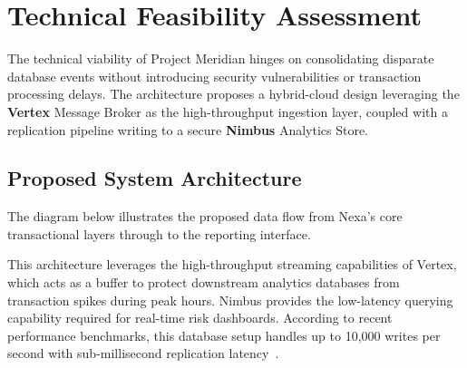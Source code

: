 \section{Technical Feasibility Assessment}
\label{sec:technical}

The technical viability of Project Meridian hinges on consolidating disparate database events without introducing security vulnerabilities or transaction processing delays. The architecture proposes a hybrid-cloud design leveraging the \textbf{Vertex} Message Broker as the high-throughput ingestion layer, coupled with a replication pipeline writing to a secure \textbf{Nimbus} Analytics Store.

\vspace{1em}
\subsection{Proposed System Architecture}
The diagram below illustrates the proposed data flow from Nexa's core transactional layers through to the reporting interface.

\vspace{1em}
\begin{center}
\end{center}
\vspace{1.2em}

This architecture leverages the high-throughput streaming capabilities of Vertex, which acts as a buffer to protect downstream analytics databases from transaction spikes during peak hours. Nimbus provides the low-latency querying capability required for real-time risk dashboards. According to recent performance benchmarks, this database setup handles up to 10,000 writes per second with sub-millisecond replication latency~\cite{nimbus2025cloud}.

